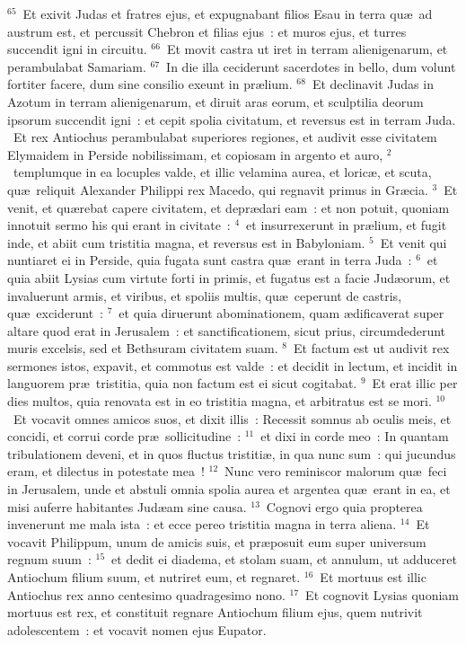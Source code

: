 ${}^{65}$~Et exivit Judas et fratres ejus, et expugnabant filios Esau in terra qu\ae\ ad austrum est, et percussit Chebron et filias ejus~: et muros ejus, et turres succendit igni in circuitu.
${}^{66}$~Et movit castra ut iret in terram alienigenarum, et perambulabat Samariam.
${}^{67}$~In die illa ceciderunt sacerdotes in bello, dum volunt fortiter facere, dum sine consilio exeunt in pr\ae lium.
${}^{68}$~Et declinavit Judas in Azotum in terram alienigenarum, et diruit aras eorum, et sculptilia deorum ipsorum succendit igni~: et cepit spolia civitatum, et reversus est in terram Juda.
~Et rex Antiochus perambulabat superiores regiones, et audivit esse civitatem Elymaidem in Perside nobilissimam, et copiosam in argento et auro,
${}^{2}$~templumque in ea locuples valde, et illic velamina aurea, et loric\ae , et scuta, qu\ae\ reliquit Alexander Philippi rex Macedo, qui regnavit primus in Gr\ae cia.
${}^{3}$~Et venit, et qu\ae rebat capere civitatem, et depr\ae dari eam~: et non potuit, quoniam innotuit sermo his qui erant in civitate~:
${}^{4}$~et insurrexerunt in pr\ae lium, et fugit inde, et abiit cum tristitia magna, et reversus est in Babyloniam.
${}^{5}$~Et venit qui nuntiaret ei in Perside, quia fugata sunt castra qu\ae\ erant in terra Juda~:
${}^{6}$~et quia abiit Lysias cum virtute forti in primis, et fugatus est a facie Jud\ae orum, et invaluerunt armis, et viribus, et spoliis multis, qu\ae\ ceperunt de castris, qu\ae\ exciderunt~:
${}^{7}$~et quia diruerunt abominationem, quam \ae dificaverat super altare quod erat in Jerusalem~: et sanctificationem, sicut prius, circumdederunt muris excelsis, sed et Bethsuram civitatem suam.
${}^{8}$~Et factum est ut audivit rex sermones istos, expavit, et commotus est valde~: et decidit in lectum, et incidit in languorem pr\ae\ tristitia, quia non factum est ei sicut cogitabat.
${}^{9}$~Et erat illic per dies multos, quia renovata est in eo tristitia magna, et arbitratus est se mori.
${}^{10}$~Et vocavit omnes amicos suos, et dixit illis~: Recessit somnus ab oculis meis, et concidi, et corrui corde pr\ae\ sollicitudine~:
${}^{11}$~et dixi in corde meo~: In quantam tribulationem deveni, et in quos fluctus tristiti\ae , in qua nunc sum~: qui jucundus eram, et dilectus in potestate mea~!
${}^{12}$~Nunc vero reminiscor malorum qu\ae\ feci in Jerusalem, unde et abstuli omnia spolia aurea et argentea qu\ae\ erant in ea, et misi auferre habitantes Jud\ae am sine causa.
${}^{13}$~Cognovi ergo quia propterea invenerunt me mala ista~: et ecce pereo tristitia magna in terra aliena.
${}^{14}$~Et vocavit Philippum, unum de amicis suis, et pr\ae posuit eum super universum regnum suum~:
${}^{15}$~et dedit ei diadema, et stolam suam, et annulum, ut adduceret Antiochum filium suum, et nutriret eum, et regnaret.
${}^{16}$~Et mortuus est illic Antiochus rex anno centesimo quadragesimo nono.
${}^{17}$~Et cognovit Lysias quoniam mortuus est rex, et constituit regnare Antiochum filium ejus, quem nutrivit adolescentem~: et vocavit nomen ejus Eupator.


